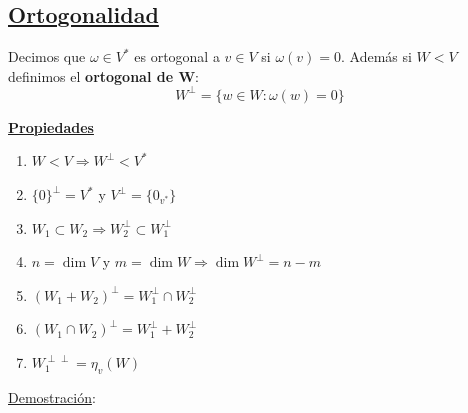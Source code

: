 \documentclass[10pt,a4paper,openright]{book}
\begin{document}
\subsection*{\underline{Ortogonalidad}}
Decimos que $\omega \in V^*$ es ortogonal a $v\in V$ si $\omega(v)=0$. Además si $W<V$ definimos el \textbf{ortogonal de W}:
$$W^\perp=\{w\in W:\omega(w)=0\}$$

\underline{\textbf{Propiedades}}
\begin{enumerate}
\item $W<V\Rightarrow W^\perp<V^*$
\item $\{0\}^\perp = V^*$ y $V^\perp = \{0_{v^*}\}$

\item $W_1\subset W_2\Rightarrow W_2^\perp \subset W_1^\perp$
\item $n=\dim V$ y $m=\dim W\Rightarrow \dim W^\perp = n-m$
\item $(W_1+W_2)^\perp = W_1^\perp \cap W_2^\perp$
\item $(W_1\cap W_2)^\perp= W_1^\perp + W_2^\perp$
\item $W_1^{\perp\perp}=\eta_v(W)$
\end{enumerate}
\underline{Demostración}:
\end{document}
